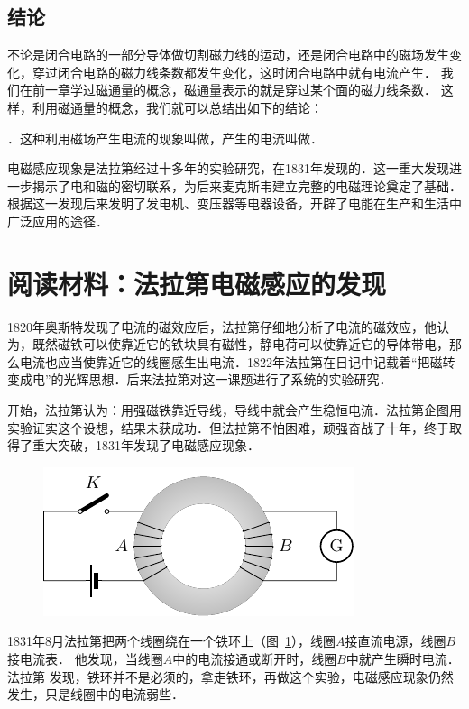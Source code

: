 \subsection*{结论}


不论是闭合电路的一部分导体做切割磁力线的运动，还是闭合电路中的磁场发生变化，穿过闭合电路的磁力线条数都发生变化，这时闭合电路中就有电流产生．
我们在前一章学过磁通量的概念，磁通量表示的就是穿过某个面的磁力线条数．
这样，利用磁通量的概念，我们就可以总结出如下的结论：

．这种利用磁场产生电流的现象叫做，产生的电流叫做．

电磁感应现象是法拉第经过十多年的实验研究，在1831年发现的．这一重大发现进一步揭示了电和磁的密切联系，为后来麦克斯韦建立完整的电磁理论奠定了基础．
根据这一发现后来发明了发电机、变压器等电器设备，开辟了电能在生产和生活中广泛应用的途径．

\section*{阅读材料：法拉第电磁感应的发现}

1820年奥斯特发现了电流的磁效应后，法拉第仔细地分析了电流的磁效应，他认为，既然磁铁可以使靠近它的铁块具有磁性，静电荷可以使靠近它的导体带电，那么电流也应当使靠近它的线圈感生出电流．1822年法拉第在日记中记载着“把磁转变成电”的光辉思想．后来法拉第对这一课题进行了系统的实验研究．

开始，法拉第认为：用强磁铁靠近导线，导线中就会产生稳恒电流．法拉第企图用实验证实这个设想，结果未获成功．但法拉第不怕困难，顽强奋战了十年，终于取得了重大突破，1831年发现了电磁感应现象．
\begin{figure}[htbp]
    \centering
    \includegraphics{fig/C/2-4.pdf}
    \caption{}\label{fig_C_2-4}
\end{figure}

1831年8月法拉第把两个线圈绕在一个铁环上（图~\ref{fig_C_2-4}），线圈$A$接直流电源，线圈$B$接电流表．
他发现，当线圈$A$中的电流接通或断开时，线圈$B$中就产生瞬时电流．法拉第
发现，铁环并不是必须的，拿走铁环，再做这个实验，电磁感应现象仍然发生，只是线圈中的电流弱些．

